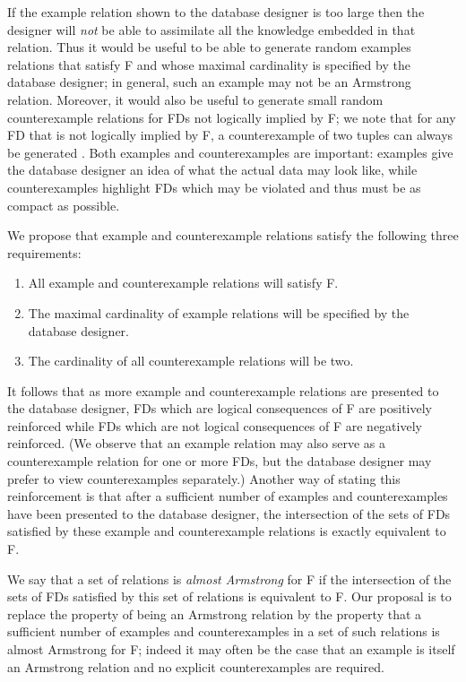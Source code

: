\smallskip

If the example relation shown to the database designer is too large then 
the designer will {\em not} be able to assimilate all the knowledge embedded in
that relation. Thus it would be useful to be able to generate random examples 
relations that satisfy F and whose maximal cardinality is specified by the 
database designer; in general, such an example may not be an Armstrong relation.
Moreover, it would also be useful to generate small random 
counterexample relations for FDs not logically implied by F; 
we note that for any FD that is not logically implied by F, 
a counterexample of two tuples can always be generated \cite{bdfs84}.
Both examples and counterexamples are important:
examples give the database designer an idea of what the actual 
data may look like, while counterexamples highlight FDs which 
may be violated and thus must be as compact as possible.

\smallskip

We propose that example and counterexample relations satisfy 
the following three requirements:
\begin{enumerate}
\item All example and counterexample relations will satisfy F.
\item The maximal cardinality of example relations will be 
specified by the database designer.
\item The cardinality of all counterexample relations will be two.
\end{enumerate}

It follows that as more example and counterexample relations are presented to
the database designer, FDs which are logical consequences of F are positively 
reinforced while FDs which are not logical consequences of F are negatively 
reinforced. (We observe that an example relation may also serve as a
counterexample relation for one or more FDs, but the database designer may
 prefer to view counterexamples separately.)
Another way of stating this reinforcement is that after a sufficient 
number of examples and counterexamples have been presented to the database 
designer, the intersection of the sets of FDs satisfied by these 
example and counterexample relations is exactly equivalent to F.

\smallskip

We say that a set of relations is {\em almost Armstrong} for F
if the intersection of the sets of FDs satisfied by this set of relations 
is equivalent to F. Our proposal is to replace the property of being an 
Armstrong relation by the property that a sufficient number
of examples and counterexamples in a set of such relations
 is almost Armstrong for F; indeed it may often be the case that an
example is itself an Armstrong relation and no explicit
counterexamples are required.

